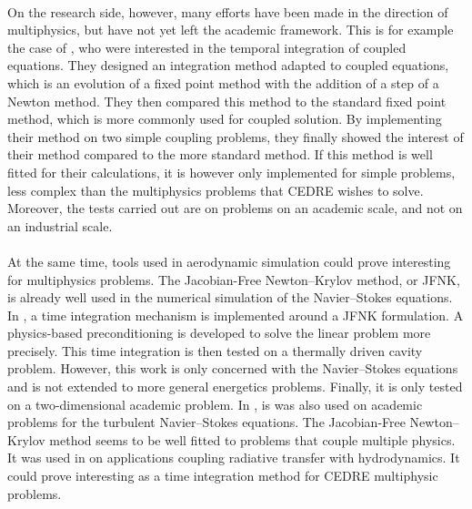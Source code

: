     \paragraph{}
    On the research side, however, many efforts have been made in the direction of multiphysics, but have not yet left the academic framework.
    This is for example the case of \cite{WongKwokHorneEtAl2019}, who were interested in the temporal integration of coupled equations.
    They designed an integration method adapted to coupled equations, which is an evolution of a fixed point method with the addition of a step of a Newton method.
    They then compared this method to the standard fixed point method, which is more commonly used for coupled solution.
    By implementing their method on two simple coupling problems, they finally showed the interest of their method compared to the more standard method.
    If this method is well fitted for their calculations, it is however only implemented for simple problems, less complex than the multiphysics problems that CEDRE wishes to solve.
    Moreover, the tests carried out are on problems on an academic scale, and not on an industrial scale.

    \paragraph{}
    At the same time, tools used in aerodynamic simulation could prove interesting for multiphysics problems.
    The Jacobian-Free Newton--Krylov method, or JFNK, is already well used in the numerical simulation of the Navier--Stokes equations.
    In \cite{ParkNourgalievMartineauEtAl2009}, a time integration mechanism is implemented around a JFNK formulation.
    A physics-based preconditioning is developed to solve the linear problem more precisely.
    This time integration is then tested on a thermally driven cavity problem.
    However, this work is only concerned with the Navier--Stokes equations and is not extended to more general energetics problems.
    Finally, it is only tested on a two-dimensional academic problem.
    In \cite{ContentOuttierCinnella2013}, is was also used on academic problems for the turbulent Navier--Stokes equations.
    The Jacobian-Free Newton--Krylov method seems to be well fitted to problems that couple multiple physics.
    It was used in \cite{Turpault2003} on applications coupling radiative transfer with hydrodynamics.
    It could prove interesting as a time integration method for CEDRE multiphysic problems.


